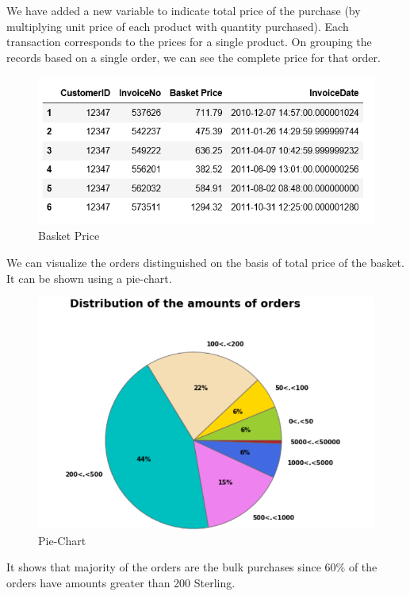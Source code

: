 We have added a new variable to indicate total price of the purchase (by multiplying unit price of each product with quantity purchased). Each transaction corresponds to the prices for a single product. On grouping the records based on a single order, we can see the complete price for that order.\\

\begin{figure}[H]
\caption{Basket Price}
\label{2.5}
\centering
\includegraphics[width=\columnwidth]{images/2_5.PNG}
\end{figure}

We can visualize the orders distinguished on the basis of total price of the basket. It can be shown using a pie-chart.

\begin{figure}[H]
\caption{Pie-Chart}
\label{2.6}
\centering
\includegraphics[width=\columnwidth]{images/2_6.PNG}
\end{figure}

It shows that majority of the orders are the bulk purchases since 60\% of the orders have amounts greater than 200 Sterling.

